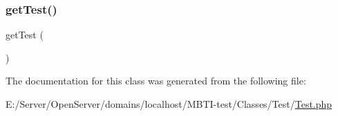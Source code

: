 \mbox{\label{class_classes_1_1_test_1_1_test_a9af17f39a73d4e6194209ba95f557e0a}} 
\subsubsection{\texorpdfstring{get\+Test()}{getTest()}}
{\footnotesize\ttfamily get\+Test (\begin{DoxyParamCaption}{ }\end{DoxyParamCaption})}



The documentation for this class was generated from the following file\+:\begin{DoxyCompactItemize}
\item 
E\+:/\+Server/\+Open\+Server/domains/localhost/\+M\+B\+T\+I-\/test/\+Classes/\+Test/\hyperlink{_classes_2_test_2_test_8php}{Test.\+php}\end{DoxyCompactItemize}
